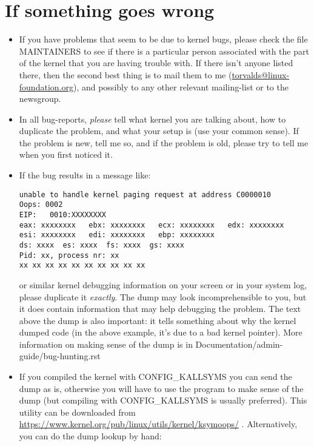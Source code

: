 \documentclass[a4paper,8pt,english]{sphinxmanual}
\begin{document}
\section{If something goes wrong}
\label{admin-guide/README:if-something-goes-wrong}\begin{itemize}
\item {} 
If you have problems that seem to be due to kernel bugs, please check
the file MAINTAINERS to see if there is a particular person associated
with the part of the kernel that you are having trouble with. If there
isn't anyone listed there, then the second best thing is to mail
them to me (\href{mailto:torvalds@linux-foundation.org}{torvalds@linux-foundation.org}), and possibly to any other
relevant mailing-list or to the newsgroup.

\item {} 
In all bug-reports, \emph{please} tell what kernel you are talking about,
how to duplicate the problem, and what your setup is (use your common
sense).  If the problem is new, tell me so, and if the problem is
old, please try to tell me when you first noticed it.

\item {} 
If the bug results in a message like:

\begin{Verbatim}[commandchars=\\\{\}]
unable to handle kernel paging request at address C0000010
Oops: 0002
EIP:   0010:XXXXXXXX
eax: xxxxxxxx   ebx: xxxxxxxx   ecx: xxxxxxxx   edx: xxxxxxxx
esi: xxxxxxxx   edi: xxxxxxxx   ebp: xxxxxxxx
ds: xxxx  es: xxxx  fs: xxxx  gs: xxxx
Pid: xx, process nr: xx
xx xx xx xx xx xx xx xx xx xx
\end{Verbatim}

or similar kernel debugging information on your screen or in your
system log, please duplicate it \emph{exactly}.  The dump may look
incomprehensible to you, but it does contain information that may
help debugging the problem.  The text above the dump is also
important: it tells something about why the kernel dumped code (in
the above example, it's due to a bad kernel pointer). More information
on making sense of the dump is in Documentation/admin-guide/bug-hunting.rst

\item {} 
If you compiled the kernel with CONFIG\_KALLSYMS you can send the dump
as is, otherwise you will have to use the  program to make
sense of the dump (but compiling with CONFIG\_KALLSYMS is usually preferred).
This utility can be downloaded from
\href{https://www.kernel.org/pub/linux/utils/kernel/ksymoops/}{https://www.kernel.org/pub/linux/utils/kernel/ksymoops/} .
Alternatively, you can do the dump lookup by hand:


\end{itemize}
\end{document}
